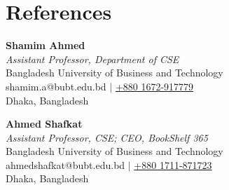 \documentclass[letterpaper,11pt]{article}
\begin{document}
\section{References}
\noindent
\begin{minipage}[t]{0.48\textwidth}
    \textbf{Shamim Ahmed} \\
    \textit{\small Assistant Professor, Department of CSE} \\
    \small Bangladesh University of Business and Technology \\
    shamim.a@bubt.edu.bd $|$ \href{tel:+8801672917779}{+880 1672-917779} \\
    Dhaka, Bangladesh
\end{minipage}
\hfill
\begin{minipage}[t]{0.48\textwidth}
    \textbf{Ahmed Shafkat} \\
    \textit{\small Assistant Professor, CSE; CEO, BookShelf 365} \\
    \small Bangladesh University of Business and Technology \\
    ahmedshafkat@bubt.edu.bd $|$ \href{tel:+8801711871723}{+880 1711-871723} \\
    Dhaka, Bangladesh
\end{minipage}
\end{document}
